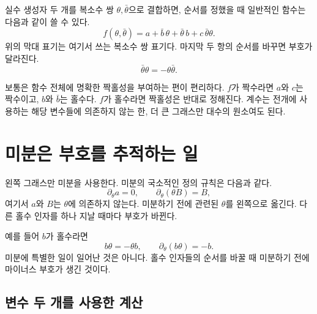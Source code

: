 실수 생성자 두 개를 복소수 쌍 \(\theta,\bar\theta\)으로 결합하면, 순서를 정했을 때 일반적인 함수는 다음과 같이 쓸 수 있다.
\begin{equation}
f(\theta,\bar\theta)
=a+\bar b\,\theta+\bar\theta\,b+c\,\bar\theta\theta.
\end{equation}
위의 막대 표기는 여기서 쓰는 복소수 쌍 표기다. 마지막 두 항의 순서를 바꾸면 부호가 달라진다.
\begin{equation}
\bar\theta\theta=-\theta\bar\theta.
\end{equation}

보통은 함수 전체에 명확한 짝홀성을 부여하는 편이 편리하다. \(f\)가 짝수라면 \(a\)와 \(c\)는 짝수이고, \(b\)와 \(\bar b\)는 홀수다. \(f\)가 홀수라면 짝홀성은 반대로 정해진다. 계수는 전개에 사용하는 해당 변수들에 의존하지 않는 한, 더 큰 그래스만 대수의 원소여도 된다.

\begin{classroomqa}
\end{classroomqa}

\section{미분은 부호를 추적하는 일}

왼쪽 그래스만 미분을 사용한다. 미분의 국소적인 정의 규칙은 다음과 같다.
\begin{equation}
\partial_\theta a=0,
\qquad
\partial_\theta(\theta B)=B,
\end{equation}
여기서 \(a\)와 \(B\)는 \(\theta\)에 의존하지 않는다. 미분하기 전에 관련된 \(\theta\)를 왼쪽으로 옮긴다. 다른 홀수 인자를 하나 지날 때마다 부호가 바뀐다.

예를 들어 \(b\)가 홀수라면
\begin{equation}
b\theta=-\theta b,
\qquad
\partial_\theta(b\theta)=-b.
\end{equation}
미분에 특별한 일이 일어난 것은 아니다. 홀수 인자들의 순서를 바꿀 때 미분하기 전에 마이너스 부호가 생긴 것이다.

\subsection{변수 두 개를 사용한 계산}

